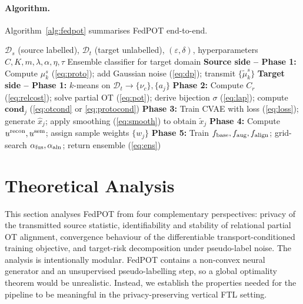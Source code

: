 \documentclass[a4paper,fleqn]{cas-sc}
\begin{document}
\paragraph{Algorithm.}
Algorithm~\ref{alg:fedpot} summarises FedPOT end-to-end.

\begin{algorithm}[t]
\caption{FedPOT}
\label{alg:fedpot}
\begin{algorithmic}[1]
\Require $\mathcal{D}_s$ (source labelled), $\mathcal{D}_t$ (target
  unlabelled), $(\varepsilon,\delta)$, hyperparameters
  $C,K,m,\lambda,\alpha,\eta,\tau$
\Ensure Ensemble classifier for target domain
\State \textbf{Source side -- Phase 1:} Compute $\mu_k^s$
  (\eqref{eq:proto}); add Gaussian noise (\eqref{eq:dp});
  transmit $\{\tilde\mu_k^s\}$
\State \textbf{Target side -- Phase 1:} $k$-means on $\mathcal{D}_t
  \to \{\nu_c\},\{a_j\}$
\State \textbf{Phase 2:} Compute $C_r$ (\eqref{eq:relcost}); solve
  partial OT (\eqref{eq:pot}); derive bijection $\sigma$ (\eqref{eq:lap});
  compute $\mathbf{cond}_j$ (\eqref{eq:otcond} or \eqref{eq:protocond})
\State \textbf{Phase 3:} Train CVAE with loss (\eqref{eq:loss});
  generate $\hat x_j$; apply smoothing (\eqref{eq:smooth}) to obtain
  $\tilde x_j$
\State \textbf{Phase 4:} Compute $u^{\rm recon},u^{\rm sem}$; assign
  sample weights $\{w_j\}$
\State \textbf{Phase 5:} Train $f_{\rm base},f_{\rm aug},f_{\rm align}$;
  grid-search $\alpha_{\rm fus},\alpha_{\rm aln}$;
  return ensemble (\eqref{eq:ens})
\end{algorithmic}
\end{algorithm}

\section{Theoretical Analysis}
\label{sec:theory}

This section analyses FedPOT from four complementary perspectives: privacy of
the transmitted source statistic, identifiability and stability of relational
partial OT alignment, convergence behaviour of the differentiable
transport-conditioned training objective, and target-risk decomposition under
pseudo-label noise. The analysis is intentionally modular. FedPOT contains a
non-convex neural generator and an unsupervised pseudo-labelling step, so a
global optimality theorem would be unrealistic. Instead, we establish the
properties needed for the pipeline to be meaningful in the privacy-preserving
vertical FTL setting.
\end{document}
